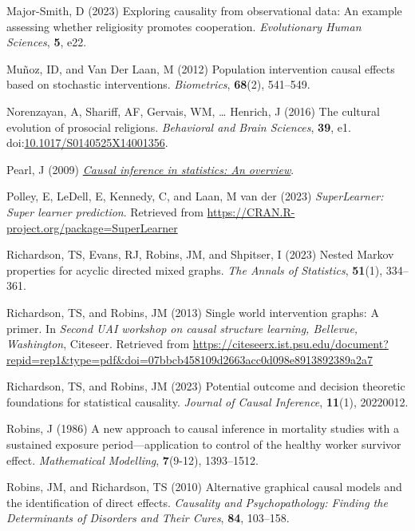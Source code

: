 \documentclass[
  single column]{article}
\newlength{\cslhangindent}
\newenvironment{CSLReferences}[2] %
 {\begin{list}{}{%
  \setlength{\itemindent}{0pt}
  \setlength{\leftmargin}{0pt}
  \setlength{\parsep}{0pt}
  \ifodd #1
   \setlength{\leftmargin}{\cslhangindent}
   \setlength{\itemindent}{-1\cslhangindent}
  \fi
  \setlength{\itemsep}{#2\baselineskip}}}
 {\end{list}}
\begin{document}
\begin{CSLReferences}{1}{0}
Major-Smith, D (2023) Exploring causality from observational data: An
example assessing whether religiosity promotes cooperation.
\emph{Evolutionary Human Sciences}, \textbf{5}, e22.

Muñoz, ID, and Van Der Laan, M (2012) Population intervention causal
effects based on stochastic interventions. \emph{Biometrics},
\textbf{68}(2), 541--549.

Norenzayan, A, Shariff, AF, Gervais, WM, \ldots{} Henrich, J (2016) The
cultural evolution of prosocial religions. \emph{Behavioral and Brain
Sciences}, \textbf{39}, e1.
doi:\href{https://doi.org/10.1017/S0140525X14001356}{10.1017/S0140525X14001356}.

Pearl, J (2009) \emph{\href{https://doi.org/10.1214/09-SS057}{Causal
inference in statistics: An overview}}.

Polley, E, LeDell, E, Kennedy, C, and Laan, M van der (2023)
\emph{SuperLearner: Super learner prediction}. Retrieved from
\url{https://CRAN.R-project.org/package=SuperLearner}

Richardson, TS, Evans, RJ, Robins, JM, and Shpitser, I (2023) Nested
{M}arkov properties for acyclic directed mixed graphs. \emph{The Annals
of Statistics}, \textbf{51}(1), 334--361.

Richardson, TS, and Robins, JM (2013) Single world intervention graphs:
A primer. In \emph{Second UAI workshop on causal structure learning,
{B}ellevue, {W}ashington}, Citeseer. Retrieved from
\url{https://citeseerx.ist.psu.edu/document?repid=rep1&type=pdf&doi=07bbcb458109d2663acc0d098e8913892389a2a7}

Richardson, TS, and Robins, JM (2023) Potential outcome and decision
theoretic foundations for statistical causality. \emph{Journal of Causal
Inference}, \textbf{11}(1), 20220012.

Robins, J (1986) A new approach to causal inference in mortality studies
with a sustained exposure period---application to control of the healthy
worker survivor effect. \emph{Mathematical Modelling}, \textbf{7}(9-12),
1393--1512.

Robins, JM, and Richardson, TS (2010) Alternative graphical causal
models and the identification of direct effects. \emph{Causality and
Psychopathology: Finding the Determinants of Disorders and Their Cures},
\textbf{84}, 103--158.


\end{CSLReferences}
\end{document}
